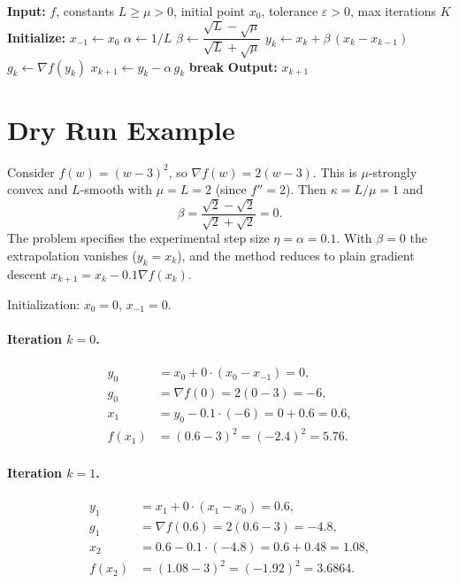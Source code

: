 \documentclass[11pt]{article}
\begin{document}
\begin{algorithm}[H]
\caption{Nesterov Accelerated Gradient (strongly convex case)}
\begin{algorithmic}[1]
\State \textbf{Input:} $f$, constants $L\ge\mu>0$, initial point $x_0$, tolerance $\varepsilon>0$, max iterations $K$
\State \textbf{Initialize:} $x_{-1}\gets x_0$
\State $\alpha \gets 1/L$
\State $\beta \gets \dfrac{\sqrt{L}-\sqrt{\mu}}{\sqrt{L}+\sqrt{\mu}}$
    \State $y_k \gets x_k + \beta\,(x_k - x_{k-1})$ 
    \State $g_k \gets \nabla f(y_k)$ 
    \State $x_{k+1} \gets y_k - \alpha\, g_k$ 
     \textbf{break} 
    \EndIf
\EndFor
\State \textbf{Output:} $x_{k+1}$
\end{algorithmic}
\end{algorithm}

\section*{Dry Run Example}

Consider $f(w)=(w-3)^2$, so $\nabla f(w) = 2(w-3)$.
This is $\mu$-strongly convex and $L$-smooth with $\mu = L = 2$ (since $f''=2$).
Then $\kappa = L/\mu = 1$ and
\[
\beta = \frac{\sqrt{2}-\sqrt{2}}{\sqrt{2}+\sqrt{2}} = 0 .
\]
The problem specifies the experimental step size $\eta=\alpha=0.1$. With $\beta=0$ the extrapolation vanishes ($y_k=x_k$), and the method reduces to plain gradient descent $x_{k+1}=x_k-0.1\nabla f(x_k)$.

Initialization: $x_0 = 0$, $x_{-1}=0$.

\paragraph{Iteration $k=0$.}
\begin{align*}
y_0 &= x_0 + 0\cdot(x_0-x_{-1}) = 0,\\
g_0 &= \nabla f(0) = 2(0-3) = -6,\\
x_1 &= y_0 - 0.1\cdot(-6) = 0 + 0.6 = 0.6,\\
f(x_1) &= (0.6-3)^2 = (-2.4)^2 = 5.76 .
\end{align*}

\paragraph{Iteration $k=1$.}
\begin{align*}
y_1 &= x_1 + 0\cdot(x_1-x_0) = 0.6,\\
g_1 &= \nabla f(0.6) = 2(0.6-3) = -4.8,\\
x_2 &= 0.6 - 0.1\cdot(-4.8) = 0.6 + 0.48 = 1.08,\\
f(x_2) &= (1.08-3)^2 = (-1.92)^2 = 3.6864 .
\end{align*}
\end{document}
